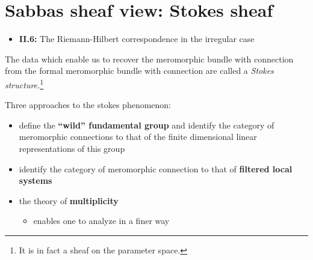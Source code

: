 \section{Sabbas sheaf view: Stokes sheaf}%
\begin{frame}[t]
  {\Huge\insertsection{}}
  \begin{itemize}
    \item \cite{sabbah2007isomonodromic} \textbf{II.6:}
      The Riemann-Hilbert correspondence in the irregular case
  \end{itemize}

  \textcolor{green!60!black}{%
    The data which enable us to recover the meromorphic bundle with connection
    from the formal meromorphic bundle with connection are called a
    \emph{Stokes structure.}\footnote{It is in fact a sheaf on the parameter
    space.}
  }

  Three approaches to the stokes phenomenon:
  \begin{itemize}
    \item define the \textbf{``wild'' fundamental group} and identify the
      category of meromorphic connections to that of the finite dimensional
      linear representations of this group
    \item identify the category of meromorphic connection to that of
      \textbf{filtered local systems}
    \item the theory of \textbf{multiplicity}
      \begin{itemize}
        \item enables one to analyze in a finer way
      \end{itemize}
  \end{itemize}
\end{frame}


